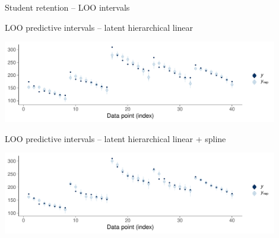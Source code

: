 \documentclass[english,t]{beamer}
\begin{document}
\begin{frame}[fragile]{Student retention -- LOO intervals}

\vspace{-0.5\baselineskip}  
LOO predictive intervals -- latent hierarchical linear\\  
  \hspace{-7mm}
  \begin{minipage}[t][3.6cm][t]{1.0\linewidth}
    \includegraphics[height=3.6cm]{student_retention_lbinom_ppc_loo_intervals.pdf}
  \end{minipage}  

\vspace{-0.5\baselineskip}  
LOO predictive intervals -- latent hierarchical linear + spline\\  
  \hspace{-7mm}
  \begin{minipage}[t][3.6cm][t]{1.0\linewidth}
    \includegraphics[height=3.6cm]{student_retention_sbinom_ppc_loo_intervals.pdf}
  \end{minipage}  

\end{frame}
  
\end{document}
